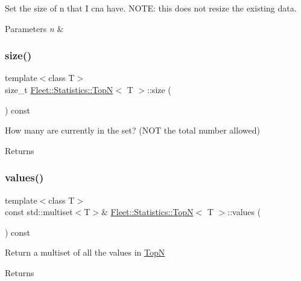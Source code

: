 Set the size of n that I cna have. N\+O\+TE\+: this does not resize the existing data. 
\begin{DoxyParams}{Parameters}
{\em n} & \\
\hline
\end{DoxyParams}
\mbox{\label{class_fleet_1_1_statistics_1_1_top_n_a0ce96f95fbac59ba2a858b66b5a6690a}} 
\subsubsection{\texorpdfstring{size()}{size()}}
{\footnotesize\ttfamily template$<$class T$>$ \\
size\+\_\+t \hyperlink{class_fleet_1_1_statistics_1_1_top_n}{Fleet\+::\+Statistics\+::\+TopN}$<$ T $>$\+::size (\begin{DoxyParamCaption}{ }\end{DoxyParamCaption}) const\hspace{0.3cm}{\ttfamily [inline]}}

How many are currently in the set? (N\+OT the total number allowed) \begin{DoxyReturn}{Returns}

\end{DoxyReturn}
\mbox{\label{class_fleet_1_1_statistics_1_1_top_n_ab7ab88abe1dd8afe6ffecf9206cbceb7}} 
\subsubsection{\texorpdfstring{values()}{values()}}
{\footnotesize\ttfamily template$<$class T$>$ \\
const std\+::multiset$<$T$>$\& \hyperlink{class_fleet_1_1_statistics_1_1_top_n}{Fleet\+::\+Statistics\+::\+TopN}$<$ T $>$\+::values (\begin{DoxyParamCaption}{ }\end{DoxyParamCaption}) const\hspace{0.3cm}{\ttfamily [inline]}}

Return a multiset of all the values in \hyperlink{class_fleet_1_1_statistics_1_1_top_n}{TopN} \begin{DoxyReturn}{Returns}

\end{DoxyReturn}
\mbox{\label{class_fleet_1_1_statistics_1_1_top_n_a7be596fb7defba492b503371c58b30ce}} 
